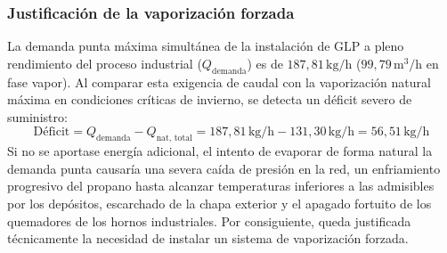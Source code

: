 \documentclass[12pt]{article}
\begin{document}
        \subsubsection{Justificación de la vaporización forzada}
        La demanda punta máxima simultánea de la instalación de GLP a pleno rendimiento del proceso industrial ($Q_{\text{demanda}}$) es de $187,81\,\text{kg/h}$ ($99,79\,\text{m}^3/\text{h}$ en fase vapor). Al comparar esta exigencia de caudal con la vaporización natural máxima en condiciones críticas de invierno, se detecta un déficit severo de suministro:
        \begin{equation}
            \text{Déficit} = Q_{\text{demanda}} - Q_{\text{nat, total}} = 187,81\,\text{kg/h} - 131,30\,\text{kg/h} = 56,51\,\text{kg/h}
        \end{equation}
        Si no se aportase energía adicional, el intento de evaporar de forma natural la demanda punta causaría una severa caída de presión en la red, un enfriamiento progresivo del propano hasta alcanzar temperaturas inferiores a las admisibles por los depósitos, escarchado de la chapa exterior y el apagado fortuito de los quemadores de los hornos industriales. Por consiguiente, queda justificada técnicamente la necesidad de instalar un sistema de vaporización forzada.
\end{document}
